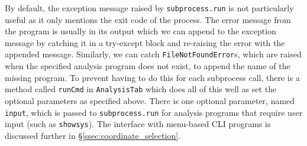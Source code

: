 \documentclass[12pt]{article}
\begin{document}
By default, the exception message raised by \texttt{subprocess.run} is not particularly useful as it only mentions the exit code of the process. The error message from the program is usually in its output which we can append to the exception message by catching it in a try-except block and re-raising the error with the appended message. Similarly, we can catch \texttt{FileNotFoundError}s, which are raised when the specified analysis program does not exist, to append the name of the missing program. To prevent having to do this for each subprocess call, there is a method called \texttt{runCmd} in \texttt{AnalysisTab} which does all of this well as set the optional parameters as specified above. There is one optional parameter, named \texttt{input}, which is passed to \texttt{subprocess.run} for analysis programs that require user input (such as \texttt{showsys}). The interface with menu-based CLI programs is discussed further in \S\ref{ssec:coordinate_selection}.
\end{document}
